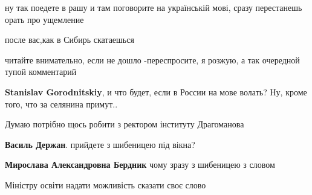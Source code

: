 \begin{itemize}
\begin{itemize}
ну так поедете в рашу и там поговорите на українській мові, сразу перестанешь орать про ущемление

 
после вас,как в Сибирь скатаешься

 
читайте внимательно, если не дошло -переспросите, я розжую, а так очередной тупой комментарий

 
\textbf{Stanislav Gorodnitskiy}, и что будет, если в России на мове волать? Ну, кроме того, что за селянина примут..
\end{itemize}

 

Думаю потрібно щось робити з ректором інституту Драгоманова

\begin{itemize}
 
\textbf{Василь Держан}. прийдете з шибеницею під вікна?

 
\textbf{Мирослава Александровна Бердник} чому зразу з шибеницею з словом
\end{itemize}

 
Міністру освіти надати можливість сказати своє слово

 

\end{itemize}
